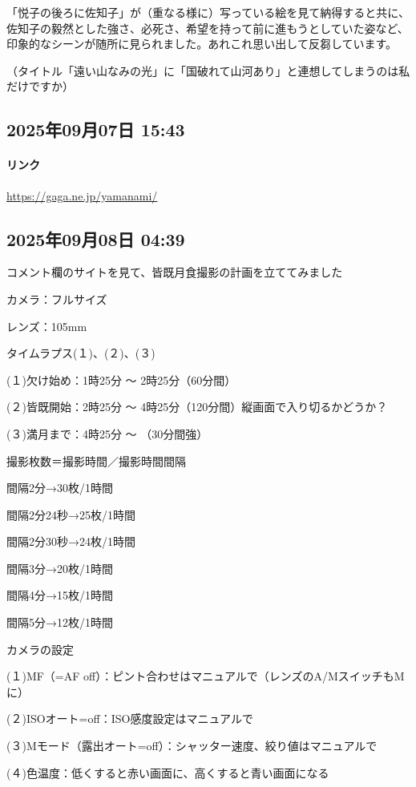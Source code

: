 \documentclass[facebook_diary.tex]{subfiles}
\begin{document}
「悦子の後ろに佐知子」が（重なる様に）写っている絵を見て納得すると共に、佐知子の毅然とした強さ、必死さ、希望を持って前に進もうとしていた姿など、印象的なシーンが随所に見られました。あれこれ思い出して反芻しています。


（タイトル「遠い山なみの光」に「国破れて山河あり」と連想してしまうのは私だけですか）

\subsection*{2025年09月07日 15:43}

\paragraph{リンク}
\url{https://gaga.ne.jp/yamanami/}

\subsection*{2025年09月08日 04:39}

コメント欄のサイトを見て、皆既月食撮影の計画を立ててみました


カメラ：フルサイズ

レンズ：105mm

タイムラプス(１)、(２)、(３)

(１)欠け始め：1時25分 〜 2時25分（60分間）

(２)皆既開始：2時25分 〜 4時25分（120分間）縦画面で入り切るかどうか？

(３)満月まで：4時25分 〜 （30分間強）


撮影枚数＝撮影時間／撮影時間間隔

間隔2分→30枚/1時間

間隔2分24秒→25枚/1時間

間隔2分30秒→24枚/1時間

間隔3分→20枚/1時間

間隔4分→15枚/1時間

間隔5分→12枚/1時間


カメラの設定

(１)MF（=AF off）：ピント合わせはマニュアルで（レンズのA/MスイッチもMに）

(２)ISOオート=off：ISO感度設定はマニュアルで

(３)Mモード（露出オート=off）：シャッター速度、絞り値はマニュアルで

(４)色温度：低くすると赤い画面に、高くすると青い画面になる
\end{document}

